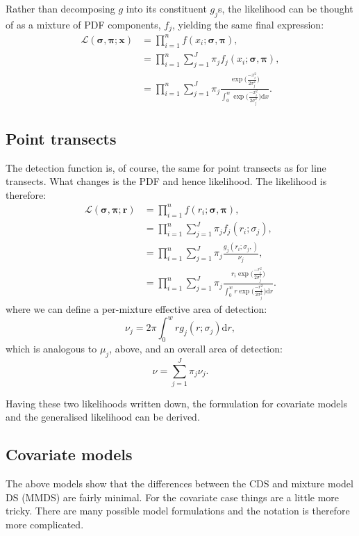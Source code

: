 Rather than decomposing $g$ into its constituent $g_j$s, the likelihood can be thought of as a mixture of PDF components, $f_j$, yielding the same final expression:
\begin{align}
\mathcal{L}(\bm{\sigma}, \bm{\pi}; \bm{x}) &= \prod_{i=1}^n f(x_i;\bm{\sigma}, \bm{\pi}),\\
&= \prod_{i=1}^n \sum_{j=1}^J \pi_j f_j(x_i;\bm{\sigma}, \bm{\pi}),\\
&= \prod_{i=1}^n \sum_{j=1}^J \pi_j \frac{\exp \Big( \frac{-x_i^2}{2 \sigma_j^2}\Big)}{\int_0^w  \exp \Big( \frac{-x_i^2}{2 \sigma_j^2}\Big) \text{d}x}.
\label{mmds-lt-likelihood-pdf}
\end{align}

\subsection{Point transects}
The detection function is, of course, the same for point transects as for line transects. What changes is the PDF and hence likelihood. The likelihood is therefore:
\begin{align}
\mathcal{L}(\bm{\sigma}, \bm{\pi}; \bm{r}) &= \prod_{i=1}^n f(r_i;\bm{\sigma}, \bm{\pi}),\\
&= \prod_{i=1}^n \sum_{j=1}^J \pi_j f_j(r_i; \sigma_j),\\
&= \prod_{i=1}^n \sum_{j=1}^J \pi_j \frac{g_j(r_i; \sigma_j,)}{\nu_j},\\
&= \prod_{i=1}^n \sum_{j=1}^J \pi_j \frac{r_i \exp \Big( \frac{-r_i^2}{2 \sigma_j^2}\Big)}{\int_0^w r  \exp \Big( \frac{-r_i^2}{2 \sigma_j^2}\Big) \text{d}r}.
\label{mmds-pt-likelihood-pdf}
\end{align}
where we can define a per-mixture effective area of detection:
\begin{equation}
\nu_j= 2 \pi \int_0^w r  g_j(r;\sigma_j) \text{d}r,
\end{equation}
which is analogous to $\mu_j$, above, and an overall area of detection:
\begin{equation}
\nu= \sum_{j=1}^J \pi_j \nu_j.
\end{equation}


Having these two likelihoods written down, the formulation for covariate models and the generalised likelihood can be derived.

\subsection{Covariate models}
The above models show that the differences between the CDS and mixture model DS (MMDS) are fairly minimal. For the covariate case things are a little more tricky. There are many possible model formulations and the notation is therefore more complicated.

